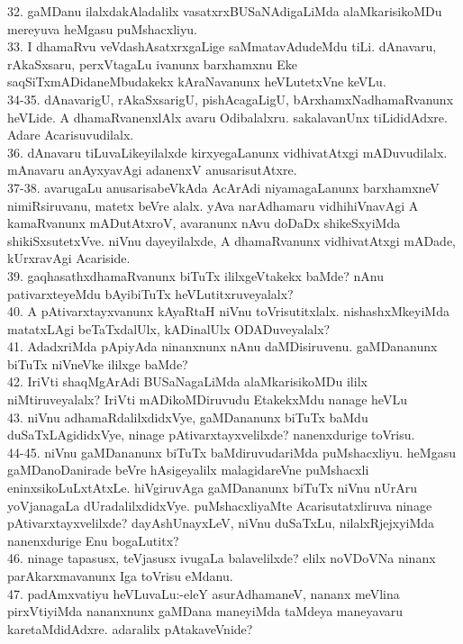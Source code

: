 \documentclass{article}
\begin{document}
32. gaMDanu ilalxdakAladalilx vasatxrxBUSaNAdigaLiMda alaMkarisikoMDu mereyuva heMgasu puMshacxliyu.\\
33. I dhamaRvu veVdashAsatxrxgaLige saMmatavAdudeMdu tiLi. dAnavaru, rAkaSxsaru, perxVtagaLu ivanunx barxhamxnu Eke saqSiTxmADidaneMbudakekx kAraNavanunx heVLutetxVne keVLu.\\
34-35. dAnavarigU, rAkaSxsarigU, pishAcagaLigU, bArxhamxNadhamaRvanunx heVLide. A dhamaRvanenxlAlx avaru Odibalalxru. sakalavanUnx tiLididAdxre. Adare Acarisuvudilalx.\\
36. dAnavaru tiLuvaLikeyilalxde kirxyegaLanunx vidhivatAtxgi mADuvudilalx. mAnavaru anAyxyavAgi adanenxV anusarisutAtxre.\\
37-38. avarugaLu anusarisabeVkAda AcArAdi niyamagaLanunx barxhamxneV nimiRsiruvanu, matetx beVre alalx. yAva narAdhamaru vidhihiVnavAgi A kamaRvanunx mADutAtxroV, avaranunx nAvu doDaDx shikeSxyiMda shikiSxsutetxVve. niVnu dayeyilalxde, A dhamaRvanunx vidhivatAtxgi mADade, kUrxravAgi Acariside.\\
39. gaqhasathxdhamaRvanunx biTuTx ililxgeVtakekx baMde? nAnu pativarxteyeMdu bAyibiTuTx heVLutitxruveyalalx?\\
40. A pAtivarxtayxvanunx kAyaRtaH niVnu toVrisutitxlalx. nishashxMkeyiMda matatxLAgi beTaTxdalUlx, kADinalUlx ODADuveyalalx?\\
41. AdadxriMda pApiyAda ninanxnunx nAnu daMDisiruvenu. gaMDananunx biTuTx niVneVke ililxge baMde?\\
42. IriVti shaqMgArAdi BUSaNagaLiMda alaMkarisikoMDu ililx niMtiruveyalalx? IriVti mADikoMDiruvudu EtakekxMdu nanage heVLu\\
43. niVnu adhamaRdalilxdidxVye, gaMDananunx biTuTx baMdu duSaTxLAgididxVye, ninage pAtivarxtayxvelilxde? nanenxdurige toVrisu.\\
44-45. niVnu gaMDananunx biTuTx baMdiruvudariMda puMshacxliyu. heMgasu gaMDanoDanirade beVre hAsigeyalilx malagidareVne puMshacxli eninxsikoLuLxtAtxLe. hiVgiruvAga gaMDananunx biTuTx niVnu nUrAru yoVjanagaLa dUradalilxdidxVye. puMshacxliyaMte Acarisutatxliruva ninage pAtivarxtayxvelilxde? dayAshUnayxLeV, niVnu duSaTxLu, nilalxRjejxyiMda nanenxdurige Enu bogaLutitx?\\
46. ninage tapasusx, teVjasusx ivugaLa balavelilxde? elilx noVDoVNa ninanx parAkarxmavanunx Iga toVrisu eMdanu.\\
47. padAmxvatiyu heVLuvaLu:-eleY asurAdhamaneV, nananx meVlina pirxVtiyiMda nananxnunx gaMDana maneyiMda taMdeya maneyavaru karetaMdidAdxre. adaralilx pAtakaveVnide?\\
\end{document}
